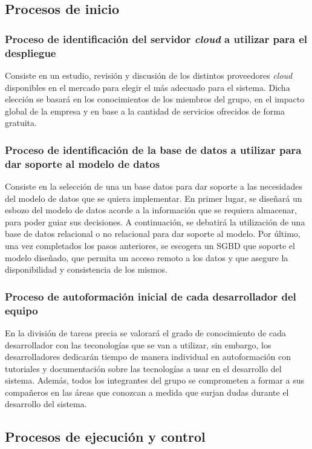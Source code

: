 \documentclass{article}
\begin{document}
\subsection{Procesos de inicio}

\subsubsection{Proceso de identificación del servidor \textit{cloud} a utilizar para el despliegue} \label{P.I.1}
Consiste en un estudio, revisión y discusión de los distintos proveedores \textit{cloud} disponibles en el mercado para elegir el más adecuado para el sistema. Dicha elección se basará en los conocimientos de los miembros del grupo, en el impacto global de la empresa y en base a la cantidad de servicios ofrecidos de forma gratuita.

\subsubsection{Proceso de identificación de la base de datos a utilizar para dar soporte al modelo de datos} \label{P.I.2}
Consiste en la selección de una un base datos para dar soporte a las necesidades del modelo de datos que se quiera implementar. En primer lugar, se diseñará un esbozo del modelo de datos acorde a la información que se requiera almacenar, para poder guiar sus decisiones. A continuación, se debatirá la utilización de una base de datos relacional o no relacional para dar soporte al modelo. Por último, una vez completados los pasos anteriores, se escogera un SGBD que soporte el modelo diseñado, que permita un acceso remoto a los datos y que asegure la disponibilidad y consistencia de los mismos.

\subsubsection{Proceso de autoformación inicial de cada desarrollador del equipo} \label{P.I.3}
En la división de tareas precia se valorará el grado de conocimiento de cada desarrollador con las teconologías que se van a utilizar, sin embargo, los desarrolladores dedicarán tiempo de manera individual en autoformación con tutoriales y documentación sobre las tecnologías a usar en el desarrollo del sistema. Además, todos los integrantes del grupo se comprometen a formar a sus compañeros en las áreas que conozcan a medida que surjan dudas durante el desarrollo del sistema.

\subsection{Procesos de ejecución y control}
\end{document}
